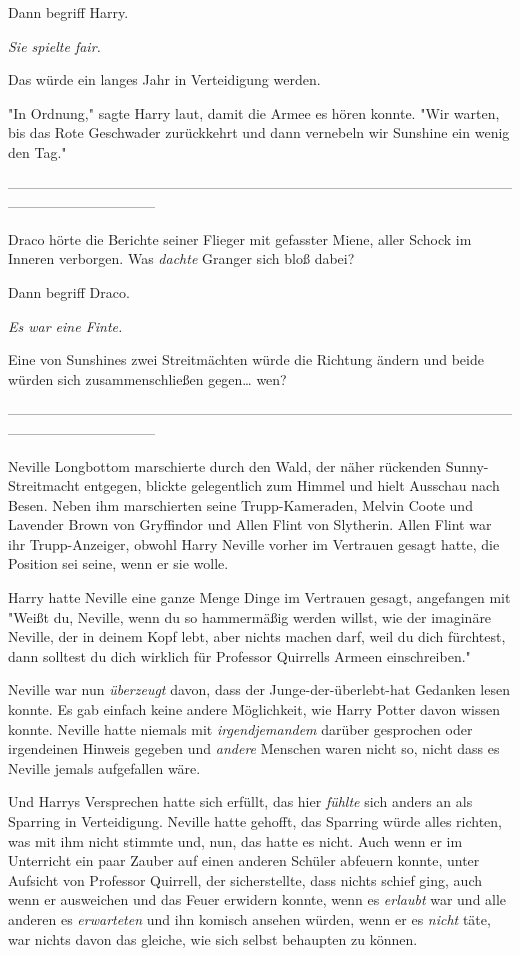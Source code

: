 {Dann begriff Harry.

\emph{Sie spielte fair.}

Das würde ein langes Jahr in Verteidigung werden.

"In Ordnung," sagte Harry laut, damit die Armee es hören konnte. "Wir warten, bis das Rote Geschwader zurückkehrt und dann vernebeln wir Sunshine ein wenig den Tag."

--------------------------------------------------------------------------------------------------------------------------------------------

Draco hörte die Berichte seiner Flieger mit gefasster Miene, aller Schock im Inneren verborgen. Was \emph{dachte} Granger sich bloß dabei?

Dann begriff Draco.

\emph{Es war eine Finte.}

Eine von Sunshines zwei Streitmächten würde die Richtung ändern und beide würden sich zusammenschließen gegen… wen?

--------------------------------------------------------------------------------------------------------------------------------------------

Neville Longbottom marschierte durch den Wald, der näher rückenden Sunny-Streitmacht entgegen, blickte gelegentlich zum Himmel und hielt Ausschau nach Besen. Neben ihm marschierten seine Trupp-Kameraden, Melvin Coote und Lavender Brown von Gryffindor und Allen Flint von Slytherin. Allen Flint war ihr Trupp-Anzeiger, obwohl Harry Neville vorher im Vertrauen gesagt hatte, die Position sei seine, wenn er sie wolle.

Harry hatte Neville eine ganze Menge Dinge im Vertrauen gesagt, angefangen mit "Weißt du, Neville, wenn du so hammermäßig werden willst, wie der imaginäre Neville, der in deinem Kopf lebt, aber nichts machen darf, weil du dich fürchtest, dann solltest du dich wirklich für Professor Quirrells Armeen einschreiben."

Neville war nun \emph{überzeugt} davon, dass der Junge-der-überlebt-hat Gedanken lesen konnte. Es gab einfach keine andere Möglichkeit, wie Harry Potter davon wissen konnte. Neville hatte niemals mit \emph{irgendjemandem} darüber gesprochen oder irgendeinen Hinweis gegeben und \emph{andere} Menschen waren nicht so, nicht dass es Neville jemals aufgefallen wäre.

Und Harrys Versprechen hatte sich erfüllt, das hier \emph{fühlte} sich anders an als Sparring in Verteidigung. Neville hatte gehofft, das Sparring würde alles richten, was mit ihm nicht stimmte und, nun, das hatte es nicht. Auch wenn er im Unterricht ein paar Zauber auf einen anderen Schüler abfeuern konnte, unter Aufsicht von Professor Quirrell, der sicherstellte, dass nichts schief ging, auch wenn er ausweichen und das Feuer erwidern konnte, wenn es \emph{erlaubt} war und alle anderen es \emph{erwarteten} und ihn komisch ansehen würden, wenn er es \emph{nicht} täte, war nichts davon das gleiche, wie sich selbst behaupten zu können.

}
